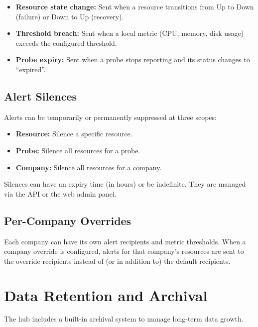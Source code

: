 \documentclass[12pt]{report}
\begin{document}
\begin{itemize}
    \item \textbf{Resource state change:} Sent when a resource transitions
          from Up to Down (failure) or Down to Up (recovery).
    \item \textbf{Threshold breach:} Sent when a local metric
          (CPU, memory, disk usage) exceeds the configured threshold.
    \item \textbf{Probe expiry:} Sent when a probe stops reporting and its
          status changes to ``expired''.
\end{itemize}

\subsection{Alert Silences}

Alerts can be temporarily or permanently suppressed at three scopes:

\begin{itemize}
    \item \textbf{Resource:} Silence a specific resource.
    \item \textbf{Probe:} Silence all resources for a probe.
    \item \textbf{Company:} Silence all resources for a company.
\end{itemize}

Silences can have an expiry time (in hours) or be indefinite. They are
managed via the API or the web admin panel.

\subsection{Per-Company Overrides}

Each company can have its own alert recipients and metric thresholds. When a
company override is configured, alerts for that company's resources are sent
to the override recipients instead of (or in addition to) the default
recipients.

\section{Data Retention and Archival}

The hub includes a built-in archival system to manage long-term data growth.
\end{document}
